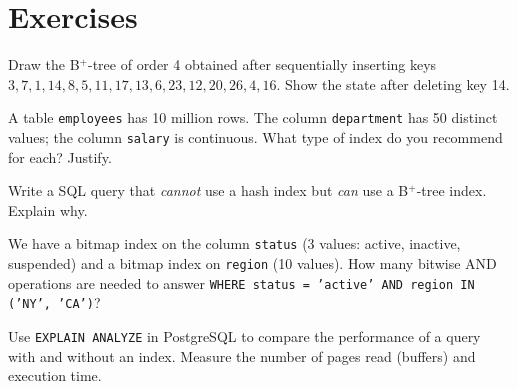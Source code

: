 \section{Exercises}

\begin{exercise}
Draw the B$^+$-tree of order 4 obtained after sequentially inserting keys
$3, 7, 1, 14, 8, 5, 11, 17, 13, 6, 23, 12, 20, 26, 4, 16$. Show the
state after deleting key 14.
\end{exercise}

\begin{exercise}
A table \texttt{employees} has 10 million rows. The column
\texttt{department} has 50 distinct values; the column \texttt{salary}
is continuous. What type of index do you recommend for each? Justify.
\end{exercise}

\begin{exercise}
Write a SQL query that \emph{cannot} use a hash index but \emph{can} use a
B$^+$-tree index. Explain why.
\end{exercise}

\begin{exercise}
We have a bitmap index on the column \texttt{status} (3 values: active,
inactive, suspended) and a bitmap index on \texttt{region} (10 values).
How many bitwise AND operations are needed to answer
\texttt{WHERE status = 'active' AND region IN ('NY', 'CA')}?
\end{exercise}

\begin{exercise}
Use \texttt{EXPLAIN ANALYZE} in PostgreSQL to compare the performance of a
query with and without an index. Measure the number of pages read (buffers)
and execution time.
\end{exercise}
